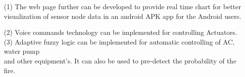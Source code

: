 \begin{justify}
(1) The web page further can be developed to provide real time chart for better visualization of sensor node data in an android APK app for the Android users.
\end{justify}\par

\begin{justify}
(2) Voice commands technology can be implemented for controlling Actuators.\\
(3) Adaptive fuzzy logic can be implemented for automatic controlling of AC, water pump\\
and other equipment’s. It can also be used to pre-detect the probability of the fire.
\end{justify}\par
